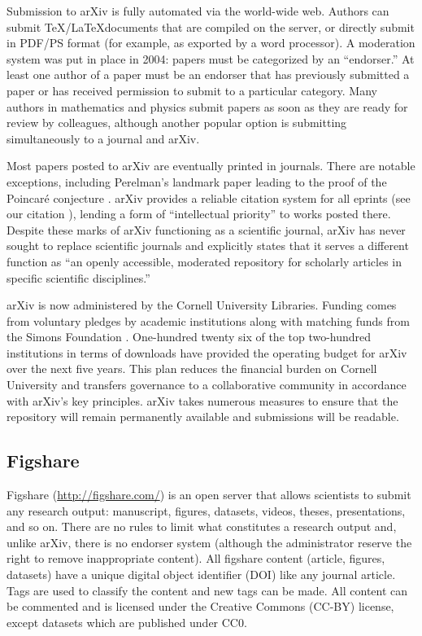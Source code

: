 \documentclass[letterpaper,twocolumn,superscriptaddress,showkeys]{revtex4}
\begin{document}
Submission to arXiv is fully automated via the world-wide web.  Authors can
submit \TeX/\LaTeX documents that are compiled on the server, or directly submit
in PDF/PS format (for example, as exported by a word processor).  A moderation
system was put in place in 2004: papers must be categorized by an ``endorser.''
At least one author of a paper must be an endorser that has previously submitted
a paper or has received permission to submit to a particular category.  Many
authors in mathematics and physics submit papers as soon as they are ready for
review by colleagues, although another popular option is submitting
simultaneously to a journal and arXiv.

Most papers posted to arXiv are eventually printed in journals.  There are
notable exceptions, including Perelman's landmark paper leading to the proof of
the Poincar\'{e} conjecture \cite{2002math.....11159P}.  arXiv provides a
reliable citation system for all eprints (see our citation
\cite{2002math.....11159P}), lending a form of ``intellectual priority'' to
works posted there.  Despite these marks of arXiv functioning as a scientific
journal, arXiv has never sought to replace scientific journals and explicitly
states that it serves a different function as ``an openly accessible, moderated
repository for scholarly articles in specific scientific disciplines.''

arXiv is now administered by the Cornell University Libraries.  Funding comes
from voluntary pledges by academic institutions along with matching funds from
the Simons Foundation \cite{arxiv_future}.  One-hundred twenty six of the top
two-hundred institutions in terms of downloads have provided the operating
budget for arXiv over the next five years.  This plan reduces the financial
burden on Cornell University and transfers governance to a collaborative
community in accordance with arXiv's key principles.  arXiv takes numerous
measures to ensure that the repository will remain permanently available and
submissions will be readable.

\subsection{Figshare}

Figshare (\href{http://figshare.com/}{http://figshare.com/}) is an open server
that allows scientists to submit any research output: manuscript, figures,
datasets, videos, theses, presentations, and so on. There are no rules to limit
what constitutes a research output and, unlike arXiv, there is no endorser
system (although the administrator reserve the right to remove inappropriate
content). All figshare content (article, figures, datasets) have a unique
digital object identifier (DOI) like any journal article. Tags are used to
classify the content and new tags can be made. All content can be commented and
is licensed under the Creative Commons (CC-BY) license, except datasets which
are published under CC0.
\end{document}
